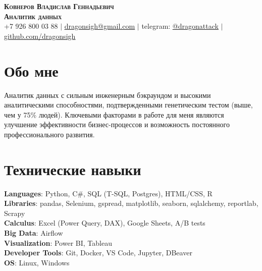 \documentclass[letterpaper,11pt]{article}
\begin{document}

\begin{center}
    \textbf{\Large \scshape Ковнеров Владислав Геннадьевич} \\ \vspace{1pt}
    \textbf{\scshape Аналитик данных} \\ \vspace{1pt}
    \small +7 926 800 03 88 $|$ \href{mailto:dragonsigh@gmail.com}{\underline{dragonsigh@gmail.com}} $|$ 
    telegram: \href{https://t.me/dragonattack}{\underline{@dragonattack}} $|$
    \href{https://github.com/DragonSigh}{\underline{github.com/dragonsigh}}
\end{center}


 \section{Обо мне}
 \begin{itemize}[leftmargin=0.15in, label={}]
    \small{\item{
     {Аналитик данных с сильным инженерным бэкраундом и высокими аналитическими способностями, подтвержденными генетическим тестом (выше, чем у 75\% людей). Ключевыми факторами в работе для меня являются улучшение эффективности бизнес-процессов и возможность постоянного профессионального развития.}
    }}
 \end{itemize}


\section{Технические навыки}
 \begin{itemize}[leftmargin=0.15in, label={}]
    \small{\item{
     \textbf{Languages}{: Python, C\#, SQL (T-SQL, Postgres), HTML/CSS, R} \\
     \textbf{Libraries}{: pandas, Selenium, gspread, matplotlib, seaborn, sqlalchemy, reportlab, Scrapy} \\
     \textbf{Calculus}{: Excel (Power Query, DAX), Google Sheets, A/B tests} \\
     \textbf{Big Data}{: Airflow} \\
     \textbf{Visualization}{: Power BI, Tableau} \\
     \textbf{Developer Tools}{: Git, Docker, VS Code, Jupyter, DBeaver} \\
     \textbf{OS}{: Linux, Windows}
    }}
 \end{itemize}
\end{document}
